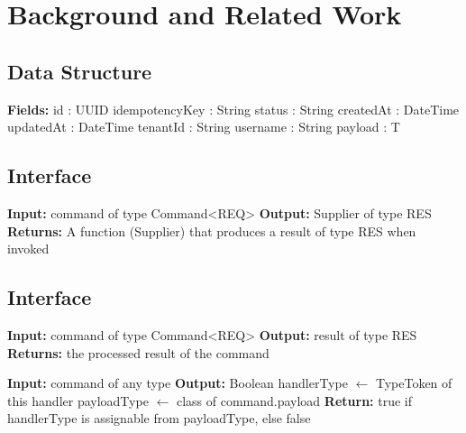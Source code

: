 \documentclass{article}
\begin{document}
\section{Background and Related Work}

\subsection{Data Structure}
\begin{algorithm}
\caption{Command Data Structure}
\begin{algorithmic}[1]
    \State \textbf{Fields:}
    \State \quad id : UUID
    \State \quad idempotencyKey : String
    \State \quad status : String
    \State \quad createdAt : DateTime
    \State \quad updatedAt : DateTime
    \State \quad tenantId : String
    \State \quad username : String
    \State \quad payload : T
\EndProcedure
\end{algorithmic}
\end{algorithm}

\subsection{Interface}
\begin{algorithm}
\caption{CommandExecutor Interface}
\begin{algorithmic}[1]
    \State \textbf{Input:} command of type Command\textless REQ\textgreater
    \State \textbf{Output:} Supplier of type RES
    \State \textbf{Returns:} A function (Supplier) that produces a result of type RES when invoked
\EndProcedure
\end{algorithmic}
\end{algorithm}

\subsection{Interface}
\begin{algorithm}
\caption{CommandHandler Interface}
\begin{algorithmic}[1]
    \State \textbf{Input:} command of type Command\textless REQ\textgreater
    \State \textbf{Output:} result of type RES
    \State \textbf{Returns:} the processed result of the command
\EndProcedure

    \State \textbf{Input:} command of any type
    \State \textbf{Output:} Boolean
    \State handlerType $\gets$ TypeToken of this handler
    \State payloadType $\gets$ class of command.payload
    \State \textbf{Return:} true if handlerType is assignable from payloadType, else false
\EndProcedure
\end{algorithmic}
\end{algorithm}
\end{document}

